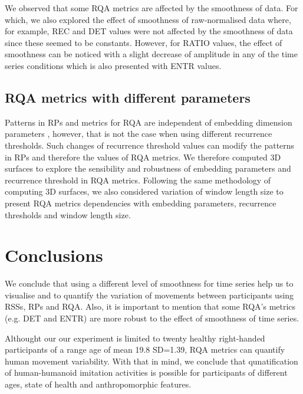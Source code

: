 We observed that some RQA metrics are affected by the smoothness of data.
For which, we also explored the effect of smoothness of raw-normalised data 
where, for example, REC and DET values were not affected by the smoothness 
of data since these seemed to be constants. However, for RATIO values, 
the effect of smoothness can be noticed with a slight decrease of amplitude 
in any of the time series conditions which is also presented with ENTR values.


\subsection{RQA metrics with different parameters}
Patterns in RPs and metrics for RQA are independent of embedding dimension parameters \cite{iwanski1998},
however, that is not the case when using different recurrence thresholds. Such changes of 
recurrence threshold values can modify the patterns in RPs and therefore the values of RQA metrics. 
We therefore computed 3D surfaces to explore the sensibility and robustness of 
embedding parameters and recurrence threshold in RQA  metrics. 
Following the same methodology of computing 3D surfaces, we also considered variation 
of window length size to present RQA metrics dependencies with embedding parameters, 
recurrence thresholds and window length size.





\section{Conclusions}
We conclude that using a different level of smoothness for time series help us 
to visualise and to quantify the variation of movements between participants 
using RSSs, RPs and RQA. Also, it is important to mention that some RQA's metrics 
(e.g. DET and  ENTR) are more robust to the effect of smoothness of time series.

Althought our our experiment is limited to twenty healthy right-handed participants 
of a range age of mean 19.8 SD=1.39, RQA metrics can quantify human movement 
variability. With that in mind, we conclude that qunatification of human-humanoid
imitation activities is possible for participants of different ages, state of health 
and anthropomorphic features.


%
%

